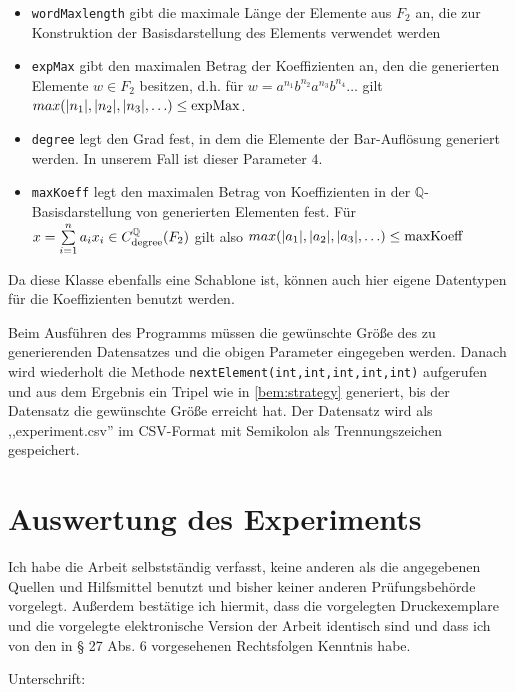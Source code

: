 \documentclass[a4paper,twoside,10pt]{scrreprt}
\newcommand{\Q}{\mathbb{Q}}
\theoremstyle{definition}
\begin{document}
\begin{itemize}
\begin{itemize}
\item \lstinline|wordMaxlength| gibt die maximale Länge der Elemente aus $F_2$ an, die zur Konstruktion der Basisdarstellung des Elements verwendet werden
\item \lstinline|expMax| gibt den maximalen Betrag der Koeffizienten an, den die generierten Elemente $w\in F_2$ besitzen, d.h. für $w=a^{n_1}b^{n_2}a^{n_3}b^{n_4}\ldots$ gilt $max(|n_1|,|n_2|,\\|n_3|,\ldots)\leq \text{\lstinline|expMax|}$.
\item \lstinline|degree| legt den Grad fest, in dem die Elemente der Bar-Auflösung generiert werden. In unserem Fall ist dieser Parameter $4$.
\item \lstinline|maxKoeff| legt den maximalen Betrag von Koeffizienten in der $\Q$-Basis\-darstellung von generierten Elementen fest. Für $x=\sum\limits_{i=1}^na_ix_i\in C_{\text{\lstinline|degree|}}^{\Q}(F_2)$ gilt also $max(|a_1|,|a_2|,|a_3|,\ldots)\leq \text{\lstinline|maxKoeff|}$
\end{itemize}
Da diese Klasse ebenfalls eine Schablone ist, können auch hier eigene Datentypen für die Koeffizienten benutzt werden.
\end{itemize}
Beim Ausführen des Programms müssen die gewünschte Größe des zu generierenden Datensatzes und die obigen Parameter eingegeben werden. Danach wird wiederholt die Methode \lstinline|nextElement(int,int,int,int,int)| aufgerufen und aus dem Ergebnis ein Tripel wie in \cref{bem:strategy} generiert, bis der Datensatz die gewünschte Größe erreicht hat. Der Datensatz wird als ,,experiment.csv'' im CSV-Format mit Semikolon als Trennungszeichen gespeichert.
\chapter{Auswertung des Experiments}
\nocite{loeha}
\nocite{loehb}
\nocite{frigerio}
\printbibliography
\newpage
\cleardoublepage
\pagestyle{empty}
\noindent
Ich habe die Arbeit selbstständig verfasst, keine anderen als die angegebenen Quellen und Hilfsmittel benutzt und bisher keiner anderen Prüfungsbehörde vorgelegt. Außerdem bestätige ich hiermit, dass die vorgelegten Druckexemplare und die vorgelegte elektronische Version der Arbeit identisch sind und dass ich von den in § 27 Abs. 6 vorgesehenen Rechtsfolgen Kenntnis habe.\par\hfill\par\noindent
Unterschrift:\hspace{0.5cm} \makebox[1.5in]{\hrulefill}
\end{document}
